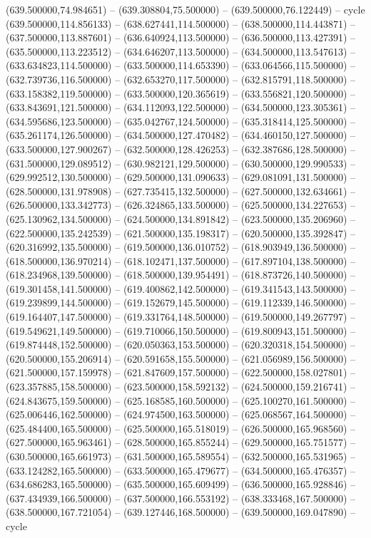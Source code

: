    (639.500000,74.984651) -- (639.308804,75.500000) -- (639.500000,76.122449) -- cycle
   (639.500000,114.856133) -- (638.627441,114.500000) -- (638.500000,114.443871) -- (637.500000,113.887601) -- (636.640924,113.500000) -- (636.500000,113.427391) -- (635.500000,113.223512) -- (634.646207,113.500000) -- (634.500000,113.547613) -- (633.634823,114.500000) -- (633.500000,114.653390) -- (633.064566,115.500000) -- (632.739736,116.500000) -- (632.653270,117.500000) -- (632.815791,118.500000) -- (633.158382,119.500000) -- (633.500000,120.365619) -- (633.556821,120.500000) -- (633.843691,121.500000) -- (634.112093,122.500000) -- (634.500000,123.305361) -- (634.595686,123.500000) -- (635.042767,124.500000) -- (635.318414,125.500000) -- (635.261174,126.500000) -- (634.500000,127.470482) -- (634.460150,127.500000) -- (633.500000,127.900267) -- (632.500000,128.426253) -- (632.387686,128.500000) -- (631.500000,129.089512) -- (630.982121,129.500000) -- (630.500000,129.990533) -- (629.992512,130.500000) -- (629.500000,131.090633) -- (629.081091,131.500000) -- (628.500000,131.978908) -- (627.735415,132.500000) -- (627.500000,132.634661) -- (626.500000,133.342773) -- (626.324865,133.500000) -- (625.500000,134.227653) -- (625.130962,134.500000) -- (624.500000,134.891842) -- (623.500000,135.206960) -- (622.500000,135.242539) -- (621.500000,135.198317) -- (620.500000,135.392847) -- (620.316992,135.500000) -- (619.500000,136.010752) -- (618.903949,136.500000) -- (618.500000,136.970214) -- (618.102471,137.500000) -- (617.897104,138.500000) -- (618.234968,139.500000) -- (618.500000,139.954491) -- (618.873726,140.500000) -- (619.301458,141.500000) -- (619.400862,142.500000) -- (619.341543,143.500000) -- (619.239899,144.500000) -- (619.152679,145.500000) -- (619.112339,146.500000) -- (619.164407,147.500000) -- (619.331764,148.500000) -- (619.500000,149.267797) -- (619.549621,149.500000) -- (619.710066,150.500000) -- (619.800943,151.500000) -- (619.874448,152.500000) -- (620.050363,153.500000) -- (620.320318,154.500000) -- (620.500000,155.206914) -- (620.591658,155.500000) -- (621.056989,156.500000) -- (621.500000,157.159978) -- (621.847609,157.500000) -- (622.500000,158.027801) -- (623.357885,158.500000) -- (623.500000,158.592132) -- (624.500000,159.216741) -- (624.843675,159.500000) -- (625.168585,160.500000) -- (625.100270,161.500000) -- (625.006446,162.500000) -- (624.974500,163.500000) -- (625.068567,164.500000) -- (625.484400,165.500000) -- (625.500000,165.518019) -- (626.500000,165.968560) -- (627.500000,165.963461) -- (628.500000,165.855244) -- (629.500000,165.751577) -- (630.500000,165.661973) -- (631.500000,165.589554) -- (632.500000,165.531965) -- (633.124282,165.500000) -- (633.500000,165.479677) -- (634.500000,165.476357) -- (634.686283,165.500000) -- (635.500000,165.609499) -- (636.500000,165.928846) -- (637.434939,166.500000) -- (637.500000,166.553192) -- (638.333468,167.500000) -- (638.500000,167.721054) -- (639.127446,168.500000) -- (639.500000,169.047890) -- cycle
